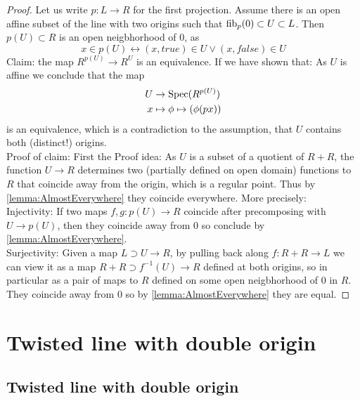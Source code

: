 \begin{proof}
	Let us write $p : L \to R$ for the first projection.
	Assume there is an open affine subset of the line with two origins such that $\operatorname{fib}_p(0) \subset U \subset L$. Then $p(U) \subset R$ is an open neigbhorhood of 0, as 
	\[
	x \in p(U) \leftrightarrow (x,true) \in U \lor (x,false) \in U
	\]
	Claim: the map $R^{p(U)} \to R^U$ is an equivalence. If we have shown that: As $U$ is affine we conclude that the map
	\begin{align*}
		U &\to \operatorname{Spec} (R^{p(U)}) \\
		x &\mapsto \phi \mapsto (\phi(px))		
	\end{align*}
	is an equivalence, which is a contradiction to the assumption, that $U$ contains both (distinct!) origins. \\
	Proof of claim: 
	First the Proof idea: As $U$ is a subset of a quotient of $R + R$, the function $U \to R$ determines two (partially defined on open domain) functions to $R$ that coincide away from the origin, which is a regular point. Thus by \ref{lemma:AlmostEverywhere} they coincide everywhere. More precisely:\\
	Injectivity: If two maps $f , g : p(U) \to R$ coincide after precomposing with $U \to p(U)$, then they coincide away from $0$
	so conclude by \ref{lemma:AlmostEverywhere}. \\
	Surjectivity: Given a map $L \supset U \to R$, by pulling back along $f : R + R \to L$  we can view it as a map $R + R \supset f^{-1}(U) \to R$ defined at both origins, so in particular as a pair of maps to $R$ defined on some open neigbhorhood of 0 in $R$. They coincide away from 0 so by \ref{lemma:AlmostEverywhere} they are equal.
\end{proof}
\ifsc
\section{Twisted line with double origin}
\else
\subsection{Twisted line with double origin}
\fi


